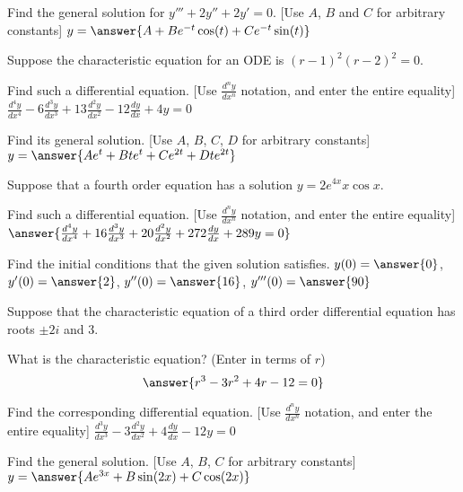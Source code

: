 \documentclass{ximera}
\begin{document}
\begin{exercise}
    Find the general solution for $y''' + 2 y'' + 2 y' = 0$. [Use $A$, $B$ and $C$ for arbitrary constants] $y = \answer{A + Be^{-t}\cos(t) + Ce^{-t}\sin(t)}$
\end{exercise}

\begin{exercise}
    Suppose the characteristic equation for an ODE is ${(r-1)}^2{(r-2)}^2 = 0$.
    
    Find such a differential equation. [Use $\frac{d^ny}{dx^n}$ notation, and enter the entire equality] $\frac{d^4y}{dx^4} - 6\frac{d^3y}{dx^3} + 13\frac{d^2y}{dx^2} - 12\frac{dy}{dx} + 4y = 0$
    \begin{problem}
        Find its general solution. [Use $A$, $B$, $C$, $D$ for arbitrary constants] $y = \answer{Ae^t + Bte^t + Ce^{2t} + Dte^{2t}}$
    \end{problem}
\end{exercise}

\begin{exercise} \label{hol:eqfromsolex}
    Suppose that a fourth order equation has a solution $y = 2 e^{4x} x \cos x$.  
    
    Find such a differential equation. [Use $\frac{d^ny}{dx^n}$ notation, and enter the entire equality] $\answer{\frac{d^4y}{dx^4} + 16\frac{d^3y}{dx^3} + 20\frac{d^2y}{dx^2} + 272\frac{dy}{dx} + 289y = 0}$
    \begin{problem}
        Find the initial conditions that the given solution satisfies. $y(0) = \answer{0}$, $y'(0) = \answer{2}$, $y''(0) = \answer{16}$, $y'''(0) = \answer{90}$
    \end{problem}
\end{exercise}

\begin{exercise}
    Suppose that the characteristic equation of a third order differential equation has roots $\pm 2i$ and 3.
    
    What is the characteristic equation? (Enter in terms of $r$)
    \[
        \answer{r^3 - 3r^2 + 4r - 12 = 0}
    \]
    \begin{problem}
        Find the corresponding differential equation. [Use $\frac{d^ny}{dx^n}$ notation, and enter the entire equality] $\frac{d^3y}{dx^3} - 3\frac{d^2y}{dx^2} + 4\frac{dy}{dx} - 12y = 0$
        \begin{problem}
            Find the general solution. [Use $A$, $B$, $C$ for arbitrary constants] $y = \answer{A e^{3x} + B \sin(2x) + C \cos(2x)}$
        \end{problem}
    \end{problem}
\end{exercise}
\end{document}
